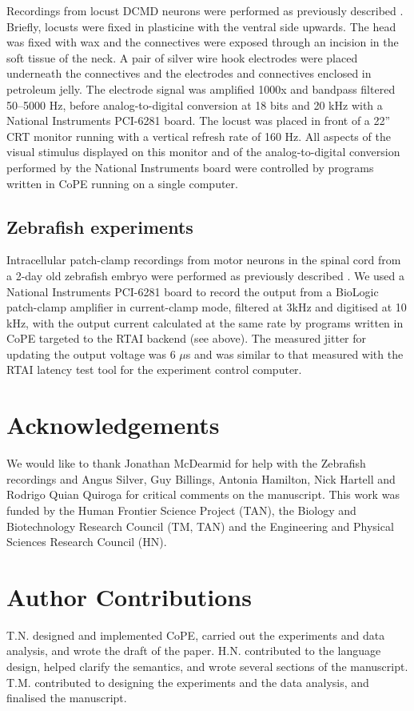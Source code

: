 Recordings from locust DCMD neurons were performed as previously
described \citep{Matheson2004}. Briefly, locusts were fixed in
plasticine with the ventral side upwards. The head was fixed with wax
and the connectives were exposed through an
incision in the soft tissue of the neck. A pair of silver wire hook
electrodes were placed underneath the connectives and the electrodes
and connectives enclosed in petroleum jelly. The electrode signal was
amplified 1000x and bandpass filtered 50--5000 Hz, before
analog-to-digital conversion at 18 bits and 20 kHz with a National
Instruments PCI-6281 board. The locust was placed in front of a 22''
CRT monitor running with a vertical refresh rate of 160 Hz. All
aspects of the visual stimulus displayed on this monitor and of
the analog-to-digital conversion performed by the National Instruments
board were controlled by programs written in 
CoPE running on a single computer.

\subsection*{Zebrafish experiments}

Intracellular patch-clamp recordings from motor neurons in the spinal
cord from a 2-day old zebrafish embryo were performed as previously
described \citep{McDearmid2006}. We used a National Instruments PCI-6281
board to
record the output from a BioLogic patch-clamp amplifier in
current-clamp mode, filtered at 3kHz and digitised at 10 kHz, with the
output current calculated at the same rate by programs written in
CoPE targeted to the RTAI backend (see
above). The measured jitter for updating the output voltage was 6
$\mu$s and was similar to that measured with the RTAI latency test
tool for the experiment control computer.

\section*{Acknowledgements} 

We would like to thank Jonathan McDearmid for help with the Zebrafish
recordings and Angus Silver, Guy Billings, Antonia Hamilton, Nick
Hartell and Rodrigo Quian Quiroga for critical comments on the
manuscript. This work was funded by the Human Frontier Science Project
(TAN), the Biology and Biotechnology Research Council (TM, TAN) and
the Engineering and Physical Sciences Research Council (HN).

\section*{Author Contributions}  
T.N. designed and implemented CoPE, carried out the experiments and
data analysis, and wrote the draft of the paper. H.N. contributed to
the language design, helped clarify the semantics, and wrote several
sections of the manuscript. T.M. contributed to designing the
experiments and the data analysis, and finalised the manuscript.




